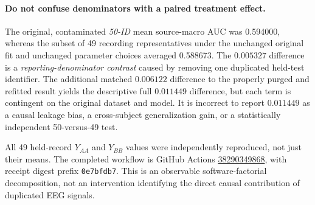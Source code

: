 \paragraph{Do not confuse denominators with a paired treatment effect.}
The original, contaminated \emph{50-ID} mean
source-macro AUC was 0.594000, whereas the subset of
49 recording representatives under the unchanged
original fit and unchanged parameter choices
averaged 0.588673. The $0.005327$ difference is
a \emph{reporting-denominator contrast} caused by
removing one duplicated held-test identifier.
The additional matched $0.006122$ difference to
the properly purged and refitted result yields
the descriptive full $0.011449$ difference,
but each term is contingent on the original
dataset and model. It is incorrect to report
$0.011449$ as a causal leakage bias, a
cross-subject generalization gain, or a
statistically independent 50-versus-49 test.

All 49 held-record $Y_{AA}$ and $Y_{BB}$ values
were independently reproduced, not just their
means. The completed workflow is GitHub Actions
\href{https://github.com/lindicaphxag-tech/kaggle/actions/runs/38290349868}{38290349868},
with receipt digest prefix \texttt{0e7bfdb7}.
This is an
observable software-factorial decomposition,
not an intervention identifying the direct
causal contribution of duplicated EEG signals.
